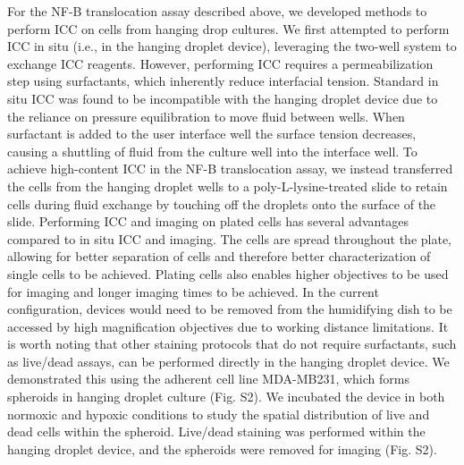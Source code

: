 For the NF-\textkappa B translocation assay described above, we developed methods to perform ICC on cells from hanging drop cultures. We first attempted to perform ICC in situ (i.e., in the hanging droplet device), leveraging the two-well system to exchange ICC reagents. However, performing ICC requires a permeabilization step using surfactants, which inherently reduce interfacial tension. Standard in situ ICC was found to be incompatible with the hanging droplet device due to the reliance on pressure equilibration to move fluid between wells. When surfactant is added to the user interface well  the surface tension decreases, causing a shuttling of fluid from the culture well into the interface well. To achieve high-content ICC in the NF-\textkappa B translocation assay, we instead transferred the cells from the hanging droplet wells to a poly-L-lysine-treated slide to retain cells during fluid exchange by touching off the droplets onto the surface of the slide.  Performing ICC and imaging on plated cells has several advantages compared to in situ ICC and imaging. The cells are spread throughout the plate, allowing for better separation of cells and therefore better characterization of single cells to be achieved. Plating cells also enables higher objectives to be used for imaging and longer imaging times to be achieved. In the current configuration, devices would need to be removed from the humidifying dish to be accessed by high magnification objectives due to working distance limitations. 
It is worth noting that other staining protocols that do not require surfactants, such as live/dead assays, can be performed directly in the hanging droplet device. We demonstrated this using the adherent cell line MDA-MB231, which forms spheroids in hanging droplet culture (Fig. S2). We incubated the device in both normoxic and hypoxic conditions to study the spatial distribution of live and dead cells within the spheroid. Live/dead staining was performed within the hanging droplet device, and the spheroids were removed for imaging (Fig. S2). 
\newline
